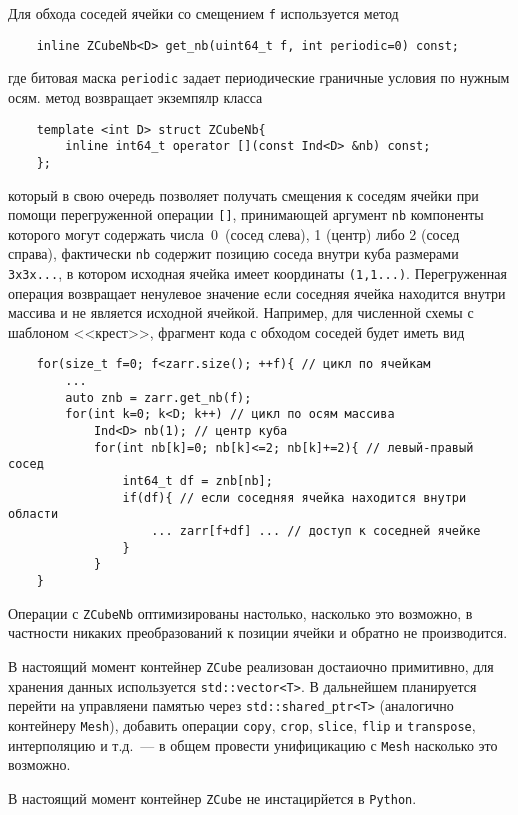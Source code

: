 Для обхода соседей ячейки со смещением \verb'f' используется метод 
\begin{verbatim}
    inline ZCubeNb<D> get_nb(uint64_t f, int periodic=0) const;
\end{verbatim}
где битовая маска \verb'periodic' задает периодические граничные условия по нужным осям.
метод возвращает экземпялр класса
\begin{verbatim}
    template <int D> struct ZCubeNb{
        inline int64_t operator [](const Ind<D> &nb) const;
    };
\end{verbatim}
который в свою очередь позволяет получать смещения к соседям ячейки при помощи перегруженной операции \verb'[]',
принимающей аргумент \verb'nb' компоненты которого могут содержать числа~0~(сосед слева), 1 (центр) либо 2 (сосед справа),
фактически \verb'nb' содержит позицию соседа внутри куба размерами \verb'3x3x...', в котором исходная ячейка имеет координаты \verb'(1,1...)'. 
Перегруженная операция возвращает ненулевое значение если соседняя ячейка находится внутри массива и не является исходной ячейкой. 
Например, для численной схемы с шаблоном <<крест>>, фрагмент кода с обходом соседей будет иметь вид
\begin{verbatim}
    for(size_t f=0; f<zarr.size(); ++f){ // цикл по ячейкам
        ...
        auto znb = zarr.get_nb(f);
        for(int k=0; k<D; k++) // цикл по осям массива
            Ind<D> nb(1); // центр куба 
            for(int nb[k]=0; nb[k]<=2; nb[k]+=2){ // левый-правый сосед
                int64_t df = znb[nb];
                if(df){ // если соседняя ячейка находится внутри области
                    ... zarr[f+df] ... // доступ к соседней ячейке
                }
            }
    }
\end{verbatim}
Операции с \verb'ZCubeNb' оптимизированы настолько, насколько это возможно, в частности никаких преобразований к позиции ячейки и обратно не производится.

В настоящий момент контейнер  \verb'ZCube' реализован достаиочно примитивно, для хранения данных используется \verb'std::vector<T>'.
В дальнейшем планируется перейти на управляени памятью через \verb'std::shared_ptr<T>' (аналогично контейнеру  \verb'Mesh'),
добавить операции \verb'copy', \verb'crop', \verb'slice', \verb'flip' и \verb'transpose', интерполяцию и т.д.~--- в общем провести унифицикацию с \verb'Mesh'
насколько это возможно.

В настоящий момент контейнер \verb'ZCube' не инстацирйется в \verb'Python'.

